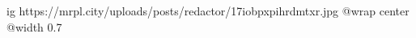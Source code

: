 
 
 
 
 

\ifcmt
  ig https://mrpl.city/uploads/posts/redactor/17iobpxpihrdmtxr.jpg
  @wrap center
  @width 0.7
\fi

